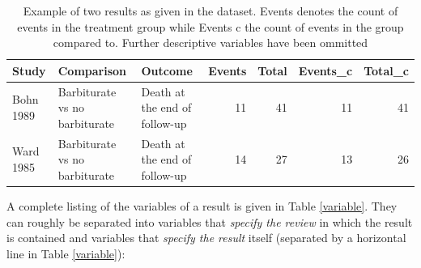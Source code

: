 \documentclass[11pt,a4paper,twoside]{book}\usepackage[]{graphicx}\usepackage[]{color}
\begin{document}
\begin{table}[ht]
\centering
\begingroup\scriptsize
\begin{tabular}{lllrrrr}
  \hline
Study & Comparison & Outcome & Events & Total & Events\_c & Total\_c \\ 
  \hline
Bohn 1989 & Barbiturate vs no barbiturate & Death at the end of follow-up & 11 & 41 & 11 & 41 \\ 
  Ward 1985 & Barbiturate vs no barbiturate & Death at the end of follow-up & 14 & 27 & 13 & 26 \\ 
   \hline
\end{tabular}
\endgroup
\caption{Example of two results as given in the dataset. Events denotes the count of events in the treatment group while Events c the count of events in the group compared to. Further descriptive variables have been ommitted} 
\label{barbiturate.row}
\end{table}


A complete listing of the variables of a result is given in Table \ref{variable}. They can roughly be separated into variables that \textit{specify the review} in which the result is contained and variables that \textit{specify the result} itself (separated by a horizontal line in Table \ref{variable}):
\end{document}
